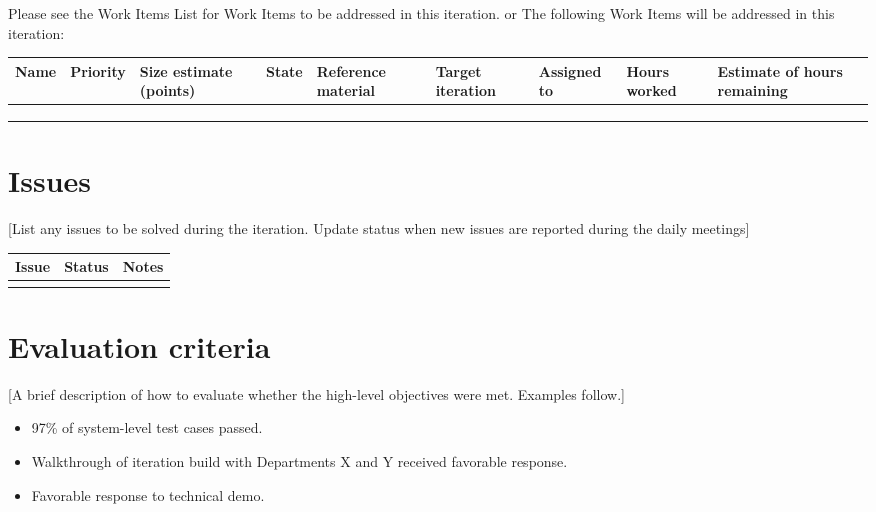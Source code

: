 \documentclass[a4paper,notitlepage]{article}%
\begin{document}
Please see the Work Items List for Work Items to be addressed in this iteration.
or
The following Work Items will be addressed in this iteration:

\begin{adjustbox}{width=\textwidth}
\noindent\begin{tabular}{|l|l|l|l|l|l|l|l|l|}
\hline
Name & Priority & Size estimate (points) & State & Reference material & Target iteration & Assigned to & Hours worked & Estimate of hours remaining \\ \hline
     &          &                        &       &                    &                  &             &              &                             \\ \hline
     &          &                        &       &                    &                  &             &              &                             \\ \hline
     &          &                        &       &                    &                  &             &              &                             \\ \hline
\end{tabular}
\end{adjustbox}

\section{Issues}

 [List any issues to be solved during the iteration. Update status when new issues are reported during the daily meetings]


\noindent\begin{tabular}{|l|l|l|}
\hline
Issue & Status & Notes \\
\hline
 &  & \\
\hline
\end{tabular}

\section{Evaluation criteria}

[A brief description of how to evaluate whether the high-level objectives were met. Examples follow.]

\begin{itemize}
	\item 97\% of system-level test cases passed.
	\item	Walkthrough of iteration build with Departments X and Y received favorable response.
	\item Favorable response to technical demo.
\end{itemize}
\end{document}
